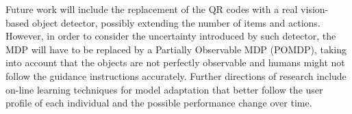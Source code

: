 \documentclass[a4paper, twoside]{article}
\begin{document}
Future work will include the replacement of the QR codes with a real vision-based object detector, possibly extending the number of items and actions. However, in order to consider the uncertainty introduced by such detector, the MDP will have to be replaced by a Partially Observable MDP (POMDP), taking into account that the objects are not perfectly observable and humans might not follow the guidance instructions accurately. Further directions of research include on-line learning techniques for model adaptation that better follow the user profile of each individual and the possible performance change over time.  

\balance


{\small
}
\end{document}
